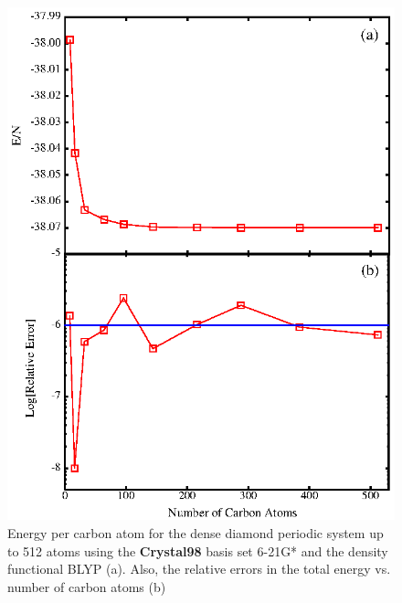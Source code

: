 \documentclass[prb,aps,nobibnotes,twocolumn,doublespace,twocolumngrid,superbib]{revtex4}
\begin{document}
\begin{figure}

\caption{\label{figure:EnergyperNandError} Energy per carbon atom for the dense diamond
periodic system up to 512 atoms using the {\bf Crystal98} basis set 6-21G* \cite{C98Basis} and the 
density functional BLYP \cite{Becke92} (a). Also, the relative errors in the total energy vs. 
number of carbon atoms (b)}

{\centering \includegraphics{EnergyVsNumber_Diamond512.ps} \par} 
\end{figure}
%
%
%
\end{document}
